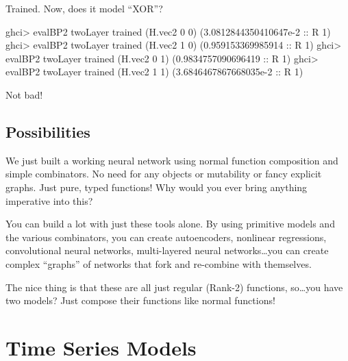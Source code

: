 \documentclass[]{article}
\newenvironment{Shaded}{}{}
\newcommand{\DataTypeTok}[1]{\textcolor[rgb]{0.56,0.13,0.00}{#1}}
\newcommand{\DecValTok}[1]{\textcolor[rgb]{0.25,0.63,0.44}{#1}}
\newcommand{\FloatTok}[1]{\textcolor[rgb]{0.25,0.63,0.44}{#1}}
\newcommand{\FunctionTok}[1]{\textcolor[rgb]{0.02,0.16,0.49}{#1}}
\newcommand{\NormalTok}[1]{#1}
\newcommand{\OtherTok}[1]{\textcolor[rgb]{0.00,0.44,0.13}{#1}}
\begin{document}
Trained. Now, does it model ``XOR''?

\begin{Shaded}
\begin{Highlighting}[]
\NormalTok{ghci}\FunctionTok{>}\NormalTok{ evalBP2 twoLayer trained (H.vec2 }\DecValTok{0} \DecValTok{0}\NormalTok{)}
\NormalTok{(}\FloatTok{3.0812844350410647e-2}\OtherTok{ ::} \DataTypeTok{R} \DecValTok{1}\NormalTok{)}
\NormalTok{ghci}\FunctionTok{>}\NormalTok{ evalBP2 twoLayer trained (H.vec2 }\DecValTok{1} \DecValTok{0}\NormalTok{)}
\NormalTok{(}\FloatTok{0.959153369985914}\OtherTok{ ::} \DataTypeTok{R} \DecValTok{1}\NormalTok{)}
\NormalTok{ghci}\FunctionTok{>}\NormalTok{ evalBP2 twoLayer trained (H.vec2 }\DecValTok{0} \DecValTok{1}\NormalTok{)}
\NormalTok{(}\FloatTok{0.9834757090696419}\OtherTok{ ::} \DataTypeTok{R} \DecValTok{1}\NormalTok{)}
\NormalTok{ghci}\FunctionTok{>}\NormalTok{ evalBP2 twoLayer trained (H.vec2 }\DecValTok{1} \DecValTok{1}\NormalTok{)}
\NormalTok{(}\FloatTok{3.6846467867668035e-2}\OtherTok{ ::} \DataTypeTok{R} \DecValTok{1}\NormalTok{)}
\end{Highlighting}
\end{Shaded}

Not bad!

\hypertarget{possibilities}{%
\subsection{Possibilities}\label{possibilities}}

We just built a working neural network using normal function composition and
simple combinators. No need for any objects or mutability or fancy explicit
graphs. Just pure, typed functions! Why would you ever bring anything imperative
into this?

You can build a lot with just these tools alone. By using primitive models and
the various combinators, you can create autoencoders, nonlinear regressions,
convolutional neural networks, multi-layered neural networks\ldots{}you can
create complex ``graphs'' of networks that fork and re-combine with themselves.

The nice thing is that these are all just regular (Rank-2) functions,
so\ldots{}you have two models? Just compose their functions like normal
functions!

\hypertarget{time-series-models}{%
\section{Time Series Models}\label{time-series-models}}
\end{document}
